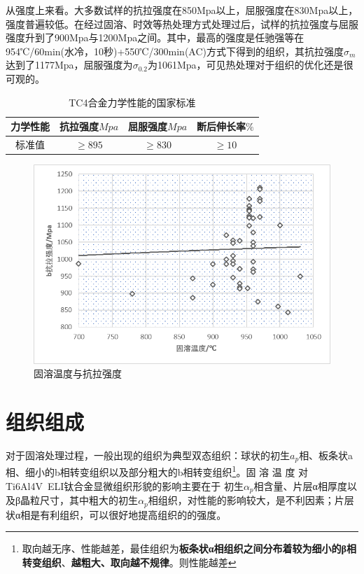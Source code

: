 \documentclass[
class = book,
zihao = -4,
font = noto,
paper = a4paper,
openany
]{easybook}
\begin{document}
从强度上来看。大多数试样的抗拉强度在850Mpa以上，屈服强度在830Mpa以上，强度普遍较低。在经过固溶、时效等热处理方式处理过后，试样的抗拉强度与屈服强度升到了900Mpa与1200Mpa之间。其中，最高的强度是任驰强等\cite{renchiqiangGurongshixiaoduiTC4taihejinxianweizuzhihelixuexingnengdeyingxiang2022}在954℃/60min(水冷，10秒)+550℃/300min(AC)方式下得到的组织，其抗拉强度$ \sigma_m $达到了1177Mpa，屈服强度为$ \sigma_{0.2} $为1061Mpa，可见热处理对于组织的优化还是很可观的。
\begin{table}[htbp]
	\centering
	\caption{TC4合金力学性能的国家标准}
	\label{sec:mytc4machin}
	\begin{tabular}{cccc}
		\toprule
		力学性能& 抗拉强度$Mpa  $& 屈服强度$ Mpa $&断后伸长率$ \% $\\ \midrule
		标准值 &$ \ge 895 $&$ \ge 830 $&$ \ge 10 $ \\ \bottomrule
	\end{tabular}
\end{table}

\begin{figure}[h!]
	\centering
	\includegraphics[width=0.7\linewidth]{固溶温度与抗拉强度}
	\caption{固溶温度与抗拉强度}
	\label{fig:gurongandstrength}
\end{figure}




\section{组织组成}
对于固溶处理过程，一般出现的组织为典型双态组织：球状的初生$ a_p $相、板条状a相、细小的b相转变组织以及部分粗大的b相转变组织\footnote{取向越无序、性能越差，最佳组织为\textbf{板条状α相组织之间分布着较为细小的β相转变组织}、\textbf{越粗大、取向越不规律}。则性能越差}。\cite{zhanghaoyinGurongShixiaoduiTC4taihejinzuzhihelixuexingnengdeyingxiang2014}固 溶 温 度 对 Ti6Al4V ELI钛合金显微组织形貌的影响主要在于 初生$ α_p $相含量、片层α相厚度以及β晶粒尺寸，其中粗大的初生$ α_p $相组织，对性能的影响较大，是不利因素；片层状α相是有利组织，可以很好地提高组织的的强度\cite{ranxingGurongwenduduiTi6Al4VELItaihejinxianweizuzhijixingnengdeyingxiang2021}。
\end{document}
